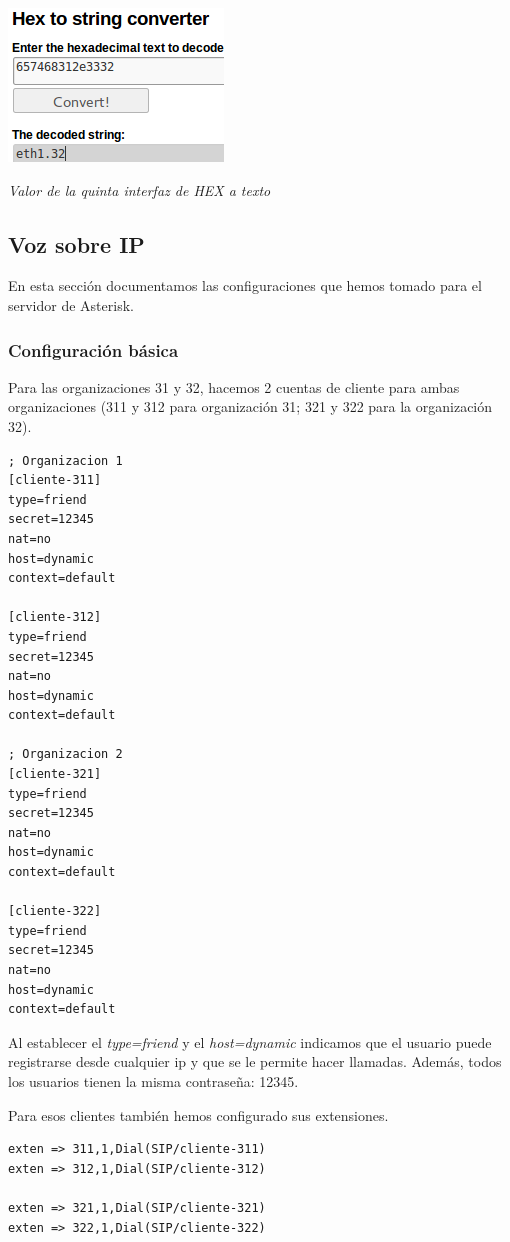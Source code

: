 \documentclass[]{article}
\begin{document}
\begin{center}
	\includegraphics[scale=0.75]{images/snmp/octet.png}
	
	\textit{Valor de la quinta interfaz de HEX a texto}
\end{center}


\subsection{Voz sobre IP}
En esta sección documentamos las configuraciones que hemos tomado para el servidor de Asterisk.

\subsubsection{Configuración básica}
Para las organizaciones 31 y 32, hacemos 2 cuentas de cliente para ambas organizaciones (311 y 312 para organización 31; 321 y 322 para la organización 32).

\begin{Verbatim}
; Organizacion 1
[cliente-311]
type=friend
secret=12345
nat=no
host=dynamic
context=default

[cliente-312]
type=friend
secret=12345
nat=no
host=dynamic
context=default

; Organizacion 2
[cliente-321]
type=friend
secret=12345
nat=no
host=dynamic
context=default

[cliente-322]
type=friend
secret=12345
nat=no
host=dynamic
context=default
\end{Verbatim}

Al establecer el \textit{type=friend} y el \textit{host=dynamic} indicamos que el usuario puede registrarse desde cualquier ip y que se le permite hacer llamadas. Además, todos los usuarios tienen la misma contraseña: 12345.

\hfill

Para esos clientes también hemos configurado sus extensiones.

\begin{Verbatim}
exten => 311,1,Dial(SIP/cliente-311)
exten => 312,1,Dial(SIP/cliente-312)

exten => 321,1,Dial(SIP/cliente-321)
exten => 322,1,Dial(SIP/cliente-322)
\end{Verbatim}
\end{document}
